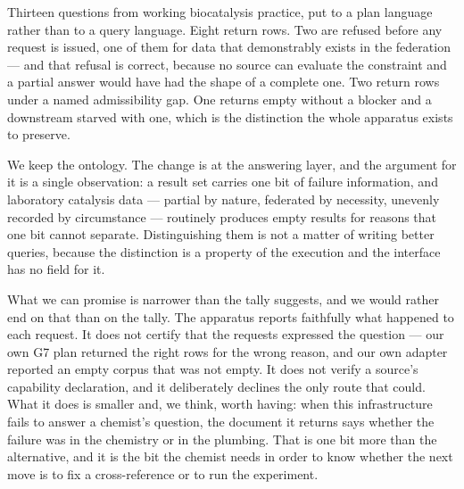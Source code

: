 \documentclass[11pt,a4paper]{article}
\theoremstyle{plain}
\theoremstyle{definition}
\theoremstyle{remark}
\newcommand{\vempty}{\textsf{empty}}
\newcommand{\vstarve}{\textsf{starved}}
\begin{document}
Thirteen questions from working biocatalysis practice, put to a plan
language rather than to a query language. Eight return rows. Two are
refused before any request is issued, one of them for data that
demonstrably exists in the federation --- and that refusal is correct,
because no source can evaluate the constraint and a partial answer would
have had the shape of a complete one. Two return rows under a named
admissibility gap. One returns \vempty{} without a blocker and a
downstream \vstarve{} with one, which is the distinction the whole
apparatus exists to preserve.

We keep the ontology. The change is at the answering layer, and the
argument for it is a single observation: a result set carries one bit of
failure information, and laboratory catalysis data --- partial by
nature, federated by necessity, unevenly recorded by circumstance ---
routinely produces empty results for reasons that one bit cannot
separate. Distinguishing them is not a matter of writing better queries,
because the distinction is a property of the execution and the interface
has no field for it.

What we can promise is narrower than the tally suggests, and we would
rather end on that than on the tally. The apparatus reports faithfully
what happened to each request. It does not certify that the requests
expressed the question --- our own G7 plan returned the right rows for
the wrong reason, and our own adapter reported an empty corpus that was
not empty. It does not verify a source's capability declaration, and it
deliberately declines the only route that could. What it does is smaller
and, we think, worth having: when this infrastructure fails to answer a
chemist's question, the document it returns says whether the failure was
in the chemistry or in the plumbing. That is one bit more than the
alternative, and it is the bit the chemist needs in order to know
whether the next move is to fix a cross-reference or to run the
experiment.



\end{document}
